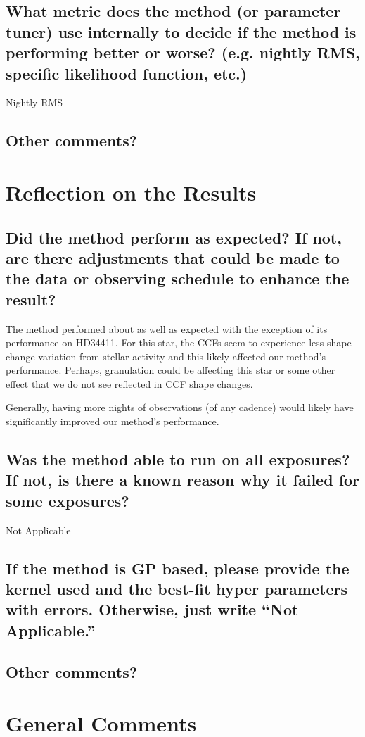 \documentclass[12pt]{article}
\begin{document}
\subsection{What metric does the method (or parameter tuner) use internally to decide if the method is performing better or worse?  (e.g. nightly RMS, specific likelihood function, etc.)} 

Nightly RMS


\subsection{Other comments?}



\section{Reflection on the Results}
\subsection{Did the method perform as expected?  If not, are there adjustments that could be made to the data or observing schedule to enhance the result?}

The method performed about as well as expected with the exception of its performance on HD34411. For this star, the CCFs seem to experience less shape change variation from stellar activity and this likely affected our method's performance. Perhaps, granulation could be affecting this star or some other effect that we do not see reflected in CCF shape changes.

Generally, having more nights of observations (of any cadence) would likely have significantly improved our method's performance.

\subsection{Was the method able to run on all exposures?  If not, is there a known reason why it failed for some exposures?}

Not Applicable


\subsection{If the method is GP based, please provide the kernel used and the best-fit hyper parameters with errors.  Otherwise, just write ``Not Applicable.''}


\subsection{Other comments?}


\section{General Comments}


\end{document}
